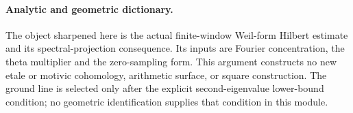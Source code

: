 \paragraph{Analytic and geometric dictionary.}
The object sharpened here is the actual finite-window Weil-form
Hilbert estimate and its spectral-projection consequence.  Its
inputs are Fourier concentration, the theta multiplier and the
zero-sampling form.  This argument constructs no new etale or
motivic cohomology, arithmetic surface, or square construction.
The ground line is selected only after the explicit second-eigenvalue
lower-bound condition; no geometric identification supplies that
condition in this module.
